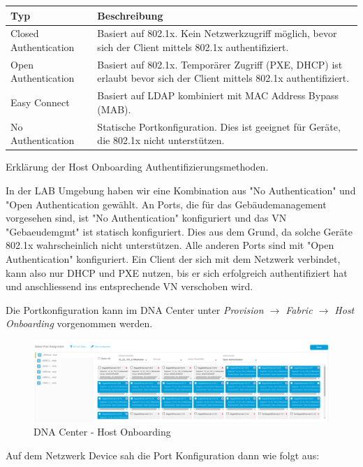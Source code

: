 \begin{tabular}{ | m{4cm} | m{12cm} | }
	\hline
	\textbf{Typ} & 	\textbf{Beschreibung} \\
	\hline
	Closed Authentication & Basiert auf 802.1x. Kein Netzwerkzugriff möglich, bevor sich der Client mittels 802.1x authentifiziert. \\
	\hline
	Open Authentication & Basiert auf 802.1x. Temporärer Zugriff (PXE, DHCP) ist erlaubt bevor sich der Client mittels 802.1x authentifiziert. \\
	\hline
	Easy Connect & Basiert auf LDAP kombiniert mit MAC Address Bypass (MAB).\\
	\hline
	No Authentication & Statische Portkonfiguration. Dies ist geeignet für Geräte, die 802.1x nicht unterstützen. \\
	\hline
\end{tabular}
\caption[Erklärung der Host Onboarding Authentifizierungsmethoden]{Erklärung der Host Onboarding Authentifizierungsmethoden.\cite{ivan-caduff-slack}}

In der LAB Umgebung haben wir eine Kombination aus "No Authentication" und "Open Authentication gewählt. An Ports, die für das Gebäudemanagement vorgesehen sind, ist "No Authentication" konfiguriert und das VN "Gebaeudemgmt" ist statisch konfiguriert. Dies aus dem Grund, da solche Geräte 802.1x wahrscheinlich nicht unterstützen. 
Alle anderen Ports sind mit "Open Authentication" konfiguriert. Ein Client der sich mit dem Netzwerk verbindet, kann also nur DHCP und PXE nutzen, bis er sich erfolgreich authentifiziert hat und anschliessend ins entsprechende VN verschoben wird.

Die Portkonfiguration kann im DNA Center unter \textit{Provision $\rightarrow$ Fabric $\rightarrow$ Host Onboarding} vorgenommen werden.

\begin{figure}[H]
	\centering
	\includegraphics[width=16cm]{img/secondtry/dna-center-host-onboarding.png}
	\caption{DNA Center - Host Onboarding}
	\label{fig:dna-center-host-onboarding}
\end{figure}

Auf dem Netzwerk Device sah die Port Konfiguration dann wie folgt aus:

